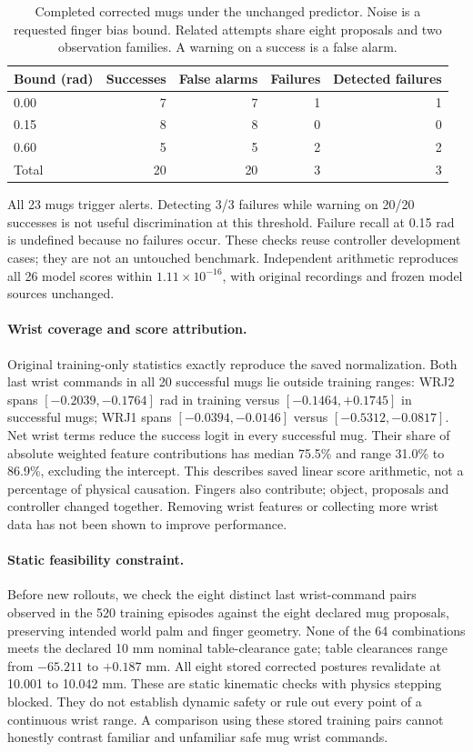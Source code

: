 \documentclass[10pt,letterpaper]{article}
\begin{document}
\begin{table}[ht]
\centering
\caption{Completed corrected mugs under the unchanged predictor. Noise is a
requested finger bias bound. Related attempts share eight proposals and two
observation families. A warning on a success is a false alarm.}
\begin{tabular}{lrrrr}
\toprule
Bound (rad) & Successes & False alarms & Failures & Detected failures\\
\midrule
0.00 & 7 & 7 & 1 & 1\\
0.15 & 8 & 8 & 0 & 0\\
0.60 & 5 & 5 & 2 & 2\\
\midrule
Total & 20 & 20 & 3 & 3\\
\bottomrule
\end{tabular}
\end{table}

All 23 mugs trigger alerts. Detecting 3/3 failures while warning on 20/20
successes is not useful discrimination at this threshold. Failure recall at
0.15 rad is undefined because no failures occur. These checks reuse controller
development cases; they are not an untouched benchmark. Independent arithmetic
reproduces all 26 model scores within $1.11\times10^{-16}$, with original
recordings and frozen model sources unchanged.

\paragraph{Wrist coverage and score attribution.}
Original training-only statistics exactly reproduce the saved normalization.
Both last wrist commands in all 20 successful mugs lie outside training ranges:
WRJ2 spans $[-0.2039,-0.1764]$ rad in training versus
$[-0.1464,+0.1745]$ in successful mugs; WRJ1 spans
$[-0.0394,-0.0146]$ versus $[-0.5312,-0.0817]$.
Net wrist terms reduce the success logit in every successful mug. Their share
of absolute weighted feature contributions has median 75.5\% and range
31.0\% to 86.9\%, excluding the intercept. This describes saved linear score
arithmetic, not a percentage of physical causation. Fingers also contribute;
object, proposals and controller changed together. Removing wrist features
or collecting more wrist data has not been shown to improve performance.

\paragraph{Static feasibility constraint.}
Before new rollouts, we check the eight distinct last wrist-command pairs
observed in the 520 training episodes against the eight declared mug proposals,
preserving intended world palm and finger geometry. None of the 64 combinations
meets the declared 10 mm nominal table-clearance gate; table clearances range
from $-65.211$ to $+0.187$ mm. All eight stored corrected postures revalidate
at 10.001 to 10.042 mm. These are static kinematic checks with physics stepping
blocked. They do not establish dynamic safety or rule out every point of a
continuous wrist range. A comparison using these stored training pairs cannot
honestly contrast familiar and unfamiliar safe mug wrist commands.
\end{document}
